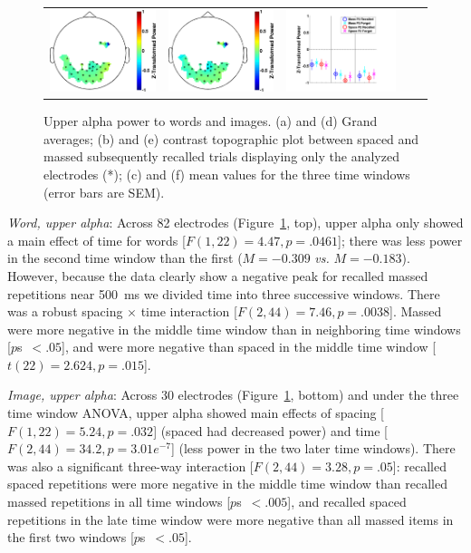 \begin{figure}[H]
\begin{tabular}{ccccc}
  \includegraphics[width=.19\textwidth]{./figs/exp1/tfr_topocont_ga_img_RgH_rc_spac_p2vsimg_RgH_rc_mass_p2_30ROIs_11_12_0_500_-1p0_1p0_cb} &
  \includegraphics[width=.19\textwidth]{./figs/exp1/tfr_topocont_ga_img_RgH_rc_spac_p2vsimg_RgH_rc_mass_p2_30ROIs_11_12_520_1000_-1p0_1p0_cb} &
  \includegraphics[width=.30\textwidth]{./figs/exp1/tfr_avg_ga_img_RgH_rc_mass_p2_img_RgH_fo_mass_p2_img_RgH_rc_spac_p2_img_RgH_fo_spac_p2_30ROI_0_333_333_666_666_1000_11_12_ylabel} \\
  \end{tabular}
  \caption{Upper alpha power to words and images.  (a) and (d) Grand averages; (b) and (e) contrast topographic plot between spaced and massed subsequently recalled trials displaying only the analyzed electrodes (*); (c) and (f) mean values for the three time windows (error bars are SEM).}
  \label{fig:word_img_alpha_upp}
\end{figure}

\textit{Word, upper alpha}: Across 82 electrodes (Figure~\ref{fig:word_img_alpha_upp}, top), upper alpha only showed a main effect of time for words [$F(1,22)=4.47, p=.0461$]; there was less power in the second time window than the first ($M=-0.309$ \textit{vs.} $M=-0.183$).  However, because the data clearly show a negative peak for recalled massed repetitions near 500~ms we divided time into three successive windows.  There was a robust spacing $\times$ time interaction [$F(2,44)=7.46, p=.0038$].  Massed were more negative in the middle time window than in neighboring time windows [$p$s~$<.05$], and were more negative than spaced in the middle time window [$t(22)=2.624, p=.015$].

\textit{Image, upper alpha}: Across 30 electrodes (Figure~\ref{fig:word_img_alpha_upp}, bottom) and under the three time window ANOVA, upper alpha showed main effects of spacing [$F(1,22)=5.24, p=.032$] (spaced had decreased power) and time [$F(2,44)=34.2, p=3.01e^{-7}$] (less power in the two later time windows).  There was also a significant three-way interaction [$F(2,44)=3.28, p=.05$]: recalled spaced repetitions were more negative in the middle time window than recalled massed repetitions in all time windows [$p$s~$<.005$], and recalled spaced repetitions in the late time window were more negative than all massed items in the first two windows [$p$s~$<.05$].


